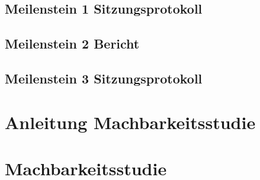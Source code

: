 \section{Meilenstein 1 Sitzungsprotokoll}


\section{Meilenstein 2 Bericht}

\section{Meilenstein 3 Sitzungsprotokoll}
\label{app:sec:protokollMeilenstein3}


\newpage
\chapter{Anleitung Machbarkeitsstudie}
\label{app:ch:AnleitungMachbarkeitsstudie}


\newpage
\chapter{Machbarkeitsstudie}
\label{app:ch:Machbarkeitsstudie}

